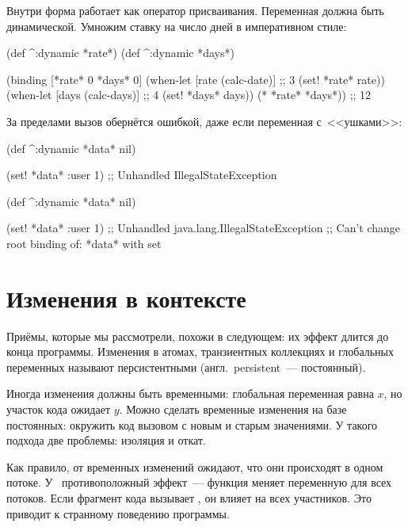 \fi

Внутри  форма  работает как оператор
присваивания. Переменная должна быть динамической. Умножим ставку на число дней
в императивном стиле:

\begin{clojure}
(def ^:dynamic *rate*)
(def ^:dynamic *days*)

(binding [*rate* 0
          *days* 0]
  (when-let [rate (calc-date)] ;; 3
    (set! *rate* rate))
  (when-let [days (calc-days)] ;; 4
    (set! *days* days))
  (* *rate* *days*))
;; 12
\end{clojure}

За пределами  вызов  обернётся ошибкой, даже если
переменная с~<<ушками>>:

\ifnarrow

\begin{clojure}
(def ^:dynamic *data* nil)

(set! *data* {:user 1})
;; Unhandled IllegalStateException
\end{clojure}

\else

\begin{clojure}
(def ^:dynamic *data* nil)

(set! *data* {:user 1})
;; Unhandled java.lang.IllegalStateException
;; Can't change root binding of: *data* with set
\end{clojure}

\fi

\section{Изменения в контексте}


Приёмы, которые мы рассмотрели, похожи в следующем: их эффект длится до конца
программы. Изменения в атомах, транзиентных коллекциях и глобальных переменных
называют персистентными (англ.~persistent~--- постоянный).

Иногда изменения должны быть временными: глобальная переменная равна $x$, но
участок кода ожидает $y$. Можно сделать временные изменения на базе постоянных:
окружить код вызовом  с новым и старым значениями. У
такого подхода две проблемы: изоляция и откат.


Как правило, от временных изменений ожидают, что они происходят в одном
потоке. У~ противоположный эффект~--- функция меняет
переменную для всех потоков. Если фрагмент кода вызывает ,
он влияет на всех участников. Это приводит к странному поведению программы.

